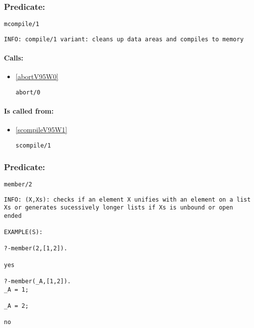 \subsubsection{Predicate:} \label{mcompileV95W1}

\begin{verbatim}
mcompile/1
\end{verbatim}

{\small \begin{verbatim}
INFO: compile/1 variant: cleans up data areas and compiles to memory

\end{verbatim}}
\paragraph{Calls:} 
\begin{itemize}
\item \ref{abortV95W0} 
\begin{verbatim}
abort/0
\end{verbatim}

\end{itemize}
\paragraph{Is called from:} 
\begin{itemize}
\item \ref{scompileV95W1} 
\begin{verbatim}
scompile/1
\end{verbatim}

\end{itemize}

\subsubsection{Predicate:} \label{memberV95W2}

\begin{verbatim}
member/2
\end{verbatim}

{\small \begin{verbatim}
INFO: (X,Xs): checks if an element X unifies with an element on a list Xs or generates sucessively longer lists if Xs is unbound or open ended

EXAMPLE(S):

?-member(2,[1,2]).

yes

?-member(_A,[1,2]).
_A = 1;

_A = 2;

no

\end{verbatim}}
